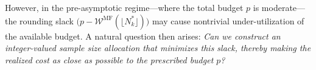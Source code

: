 However, in the pre-asymptotic regime—where the total budget $p$ is moderate—the rounding slack $\big(p - \mathcal{W}^{\text{MF}}(\lfloor N_k^* \rfloor)\big)$ may cause nontrivial under-utilization of the available budget. A natural question then arises:  
\textit{Can we construct an integer-valued sample size allocation that minimizes this slack, thereby making the realized cost as close as possible to the prescribed budget $p$?}



















